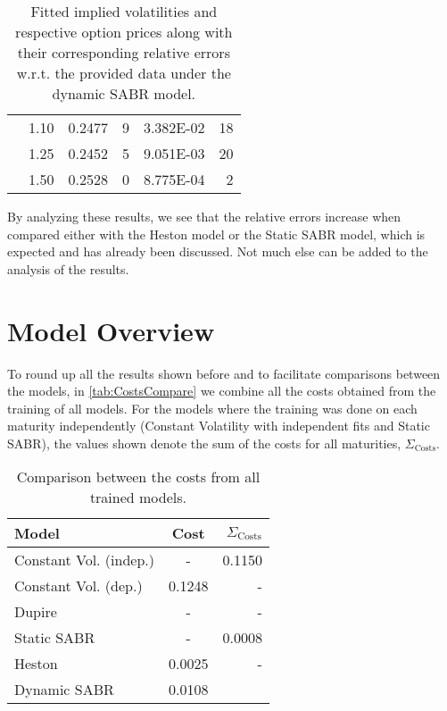 \begin{table}[H]
\begin{tabular}{@{}cccrcr@{}}
 & 1.10 & 0.2477 & 9 & \num{3.382E-02} & 18 \\
 & 1.25 & 0.2452 & 5 & \num{9.051E-03} & 20 \\
 & 1.50 & 0.2528 & 0 & \num{8.775E-04} & 2 \\ \bottomrule
\end{tabular}
  \caption[Fitted implied volatilities and respective option prices along with their corresponding relative errors w.r.t. the provided data under the dynamic SABR model.]{Fitted implied volatilities and respective option prices along with their corresponding relative errors w.r.t. the provided data under the dynamic SABR model.}
  \label{tab:DS}
\end{table}

By analyzing these results, we see that the relative errors increase when compared either with the Heston model or the Static SABR model, which is expected and has already been discussed.
Not much else can be added to the analysis of the results.


\vfill
\newpage

\section{Model Overview}
To round up all the results shown before and to facilitate comparisons between the models, in \autoref{tab:CostsCompare} we combine all the costs obtained from the training of all models. For the models where the training was done on each maturity independently (Constant Volatility with independent fits and Static SABR), the values shown denote the sum of the costs for all maturities, $\Sigma_{\mathrm{Costs}}$.
\begin{table}[H]
    \centering
        \renewcommand{\arraystretch}{0.8}
\begin{tabular}{@{}lcr@{}}
\toprule
 Model & Cost & $\Sigma_{\mathrm{Costs}}$ \\ \midrule
Constant Vol. (indep.) & - & 0.1150 \\
Constant Vol. (dep.) & 0.1248 & - \\
Dupire & - & - \\
Static SABR & - & 0.0008 \\
Heston & 0.0025 & - \\
Dynamic SABR & 0.0108\\
\bottomrule
\end{tabular}
  \caption[Comparison between the costs from all trained models.]{Comparison between the costs from all trained models.}
  \label{tab:CostsCompare}
\end{table}

